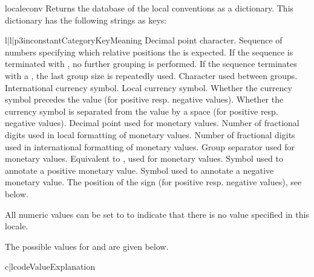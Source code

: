 \begin{funcdesc}{localeconv}{}
  Returns the database of the local conventions as a dictionary.
  This dictionary has the following strings as keys:

  \begin{tableiii}{l|l|p{3in}}{constant}{Category}{Key}{Meaning}
            {Decimal point character.}
            {Sequence of numbers specifying which relative positions
             the  is expected.  If the sequence is
             terminated with , no further grouping
             is performed. If the sequence terminates with a , 
             the last group size is repeatedly used.}
            {Character used between groups.}\hline
            {International currency symbol.}
            {Local currency symbol.}
            {Whether the currency symbol precedes the value (for positive resp.
             negative values).}
            {Whether the currency symbol is separated from the value 
             by a space (for positive resp. negative values).}
            {Decimal point used for monetary values.}
            {Number of fractional digits used in local formatting
             of monetary values.}
            {Number of fractional digits used in international
             formatting of monetary values.}
            {Group separator used for monetary values.}
            {Equivalent to , used for monetary
             values.}
            {Symbol used to annotate a positive monetary value.}
            {Symbol used to annotate a negative monetary value.}
            {The position of the sign (for positive resp. negative values), see below.}
  \end{tableiii}
  
  All numeric values can be set to  to indicate that
  there is no value specified in this locale.

  The possible values for  and
   are given below.

  \begin{tableii}{c|l}{code}{Value}{Explanation}
  \end{tableii}
\end{funcdesc}

